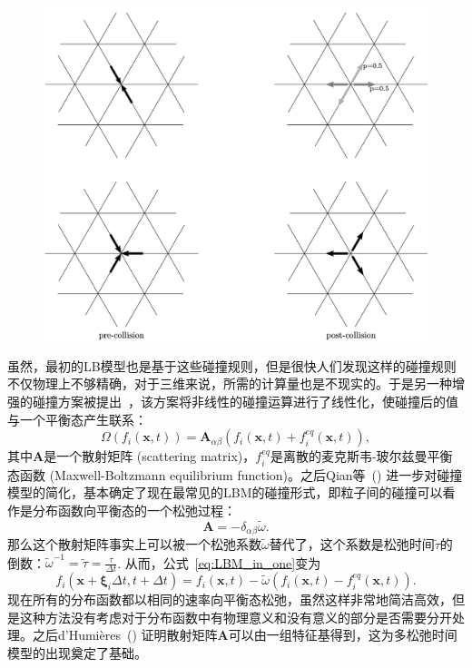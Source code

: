 \begin{figure}[htb]
    \centering
      \includegraphics[width=0.9\columnwidth]{figures/LGA_collision.png}
    \label{img:LGA_collision}
\end{figure}

虽然，最初的LB模型也是基于这些碰撞规则，但是很快人们发现这样的碰撞规则不仅物理上不够精确，对于三维来说，所需的计算量也是不现实的。于是另一种增强的碰撞方案被提出~\cite{higuera1989lattice, higuera1989boltzmann}，该方案将非线性的碰撞运算进行了线性化，使碰撞后的值与一个平衡态产生联系：
\begin{equation}
    \Omega(f_{i}(\mathbf{x}, t))=\mathbf{A}_{\alpha\beta}(f_{i}(\mathbf{x},t)+f_{i}^{eq}(\mathbf{x},t)),
\end{equation}
其中$\mathbf{A}$是一个散射矩阵 (scattering matrix)，$f_{i}^{eq}$是离散的麦克斯韦-玻尔兹曼平衡态函数 (Maxwell-Boltzmann equilibrium function)。之后Qian等~(\citeyear{qian1992lattice}) 进一步对碰撞模型的简化，基本确定了现在最常见的LBM的碰撞形式，即粒子间的碰撞可以看作是分布函数向平衡态的一个松弛过程：
\begin{equation}
    \mathbf{A}=-\delta_{\alpha\beta}\tilde{\omega}.
\end{equation}
那么这个散射矩阵事实上可以被一个松弛系数$\tilde{\omega}$替代了，这个系数是松弛时间$\tilde{\tau}$的倒数：$\tilde{\omega}^{-1}=\tilde{\tau}=\frac{\tau}{\Delta t}$. 从而，公式~\ref{eq:LBM_in_one}变为
\begin{equation}
    f_{i}(\mathbf{x}+\mathbf{\xi}_i \Delta t,t+\Delta t)=f_{i}(\mathbf{x},t)-\tilde{\omega}(f_{i}(\mathbf{x},t)-f_{i}^{eq}(\mathbf{x},t)).
    \label{eq:LBM_in_one_BGK}
\end{equation}
现在所有的分布函数都以相同的速率向平衡态松弛，虽然这样非常地简洁高效，但是这种方法没有考虑对于分布函数中有物理意义和没有意义的部分是否需要分开处理。之后d'Humières~(\citeyear{d1992generalized}) 证明散射矩阵$\mathbf{A}$可以由一组特征基得到，这为多松弛时间模型的出现奠定了基础。

